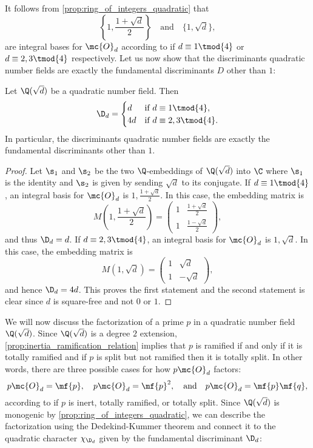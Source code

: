     It follows from \cref{prop:ring_of_integers_quadratic} that
    \[
      \left\{1,\frac{1+\sqrt{d}}{2}\right\} \quad \text{and} \quad \{1,\sqrt{d}\},
    \]
    are integral bases for $\mc{O}_{d}$ according to if $d \equiv 1 \tmod{4}$ or $d \equiv 2,3 \tmod{4}$ respectively. Let us now show that the discriminants quadratic number fields are exactly the fundamental discriminants $D$ other than $1$:

    \begin{proposition}\label{prop:discriminant_quadratic}
      Let $\Q(\sqrt{d})$ be a quadratic number field. Then
      \[
        \D_{d} = \begin{cases} d & \text{if $d \equiv 1 \tmod{4}$}, \\ 4d & \text{if $d \equiv 2,3 \tmod{4}$}. \end{cases}
      \]
      In particular, the discriminants quadratic number fields are exactly the fundamental discriminants other than $1$.
    \end{proposition}
    \begin{proof}
      Let $\s_{1}$ and $\s_{2}$ be the two $\Q$-embeddings of $\Q(\sqrt{d})$ into $\C$ where $\s_{1}$ is the identity and $\s_{2}$ is given by sending $\sqrt{d}$ to its conjugate. If $d \equiv 1 \tmod{4}$, an integral basis for $\mc{O}_{d}$ is $1,\frac{1+\sqrt{d}}{2}$. In this case, the embedding matrix is
      \[
        M\left(1,\frac{1+\sqrt{d}}{2}\right) = \begin{pmatrix} 1 & \frac{1+\sqrt{d}}{2} \\ 1 & \frac{1-\sqrt{d}}{2} \end{pmatrix},
      \]
      and thus $\D_{d} = d$. If $d \equiv 2,3 \tmod{4}$, an integral basis for $\mc{O}_{d}$ is $1,\sqrt{d}$. In this case, the embedding matrix is
      \[
        M(1,\sqrt{d}) = \begin{pmatrix} 1 & \sqrt{d} \\ 1 & -\sqrt{d} \end{pmatrix},
      \]
      and hence $\D_{d} = 4d$. This proves the first statement and the second statement is clear since $d$ is square-free and not $0$ or $1$.
    \end{proof}

    We will now discuss the factorization of a prime $p$ in a quadratic number field $\Q(\sqrt{d})$. Since $\Q(\sqrt{d})$ is a degree $2$ extension, \cref{prop:inertia_ramification_relation} implies that $p$ is ramified if and only if it is totally ramified and if $p$ is split but not ramified then it is totally split. In other words, there are three possible cases for how $p\mc{O}_{d}$ factors:
    \[
      p\mc{O}_{d} = \mf{p}, \quad p\mc{O}_{d} = \mf{p}^{2}, \quad \text{and} \quad p\mc{O}_{d} = \mf{p}\mf{q},
    \]
    according to if $p$ is inert, totally ramified, or totally split. Since $\Q(\sqrt{d})$ is monogenic by \cref{prop:ring_of_integers_quadratic}, we can describe the factorization using the Dedekind-Kummer theorem and connect it to the quadratic character $\chi_{\D_{d}}$ given by the fundamental discriminant $\D_{d}$:

